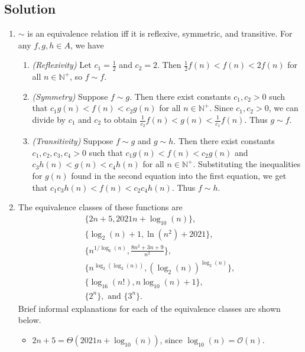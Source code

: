 \documentclass{article}
\begin{document}
\subsection*{Solution}
    \begin{enumerate}
        \item $\sim$ is an equivalence relation iff it is reflexive, symmetric, and transitive. For any $f, g, h \in A$, we have
        \begin{enumerate}[label = \arabic*.]
            \item \textit{(Reflexivity)} Let $c_{1} = \frac{1}{2}$ and $c_{2} = 2$. Then $\frac{1}{2}f(n) < f(n) < 2f(n)$ for all $n \in \mathbb{N^{+}}$, so $f \sim f$.
            \item \textit{(Symmetry)} Suppose $f \sim g$. Then there exist constants $c_{1}, c_{2} > 0$ such that $c_{1}g(n) < f(n) < c_{2}g(n)$ for all $n \in \mathbb{N^{+}}$. Since $c_{1}, c_{2} > 0$, we can divide by $c_{1}$ and $c_{2}$ to obtain $\frac{1}{c_{2}}f(n) < g(n) < \frac{1}{c_{1}}f(n)$. Thus $g \sim f$.
            \item \textit{(Transitivity)} Suppose $f \sim g$ and $g \sim h$. Then there exist constants $c_{1}, c_{2}, c_{3}, c_{4} > 0$ such that $c_{1}g(n) < f(n) < c_{2}g(n)$ and $c_{3}h(n) < g(n) < c_{4}h(n)$ for all $n \in \mathbb{N^{+}}$. Substituting the inequalities for $g(n)$ found in the second equation into the first equation, we get that $c_{1}c_{3}h(n) < f(n) < c_{2}c_{4}h(n)$. Thus $f \sim h$.
        \end{enumerate}
        \item The equivalence classes of these functions are
        \begin{gather*}
            \{2n + 5, 2021n + \log_{10}(n)\}, \\
            \{\log_{2}(n) + 1, \ln(n^{2}) + 2021\}, \\
            \{n^{1/\log_{6}(n)}, \textstyle \frac{8n^{2} + 3n + 9}{n^{2}}\}, \\
            \{n^{\log_{2}(\log_{2}(n))}, (\log_{2}(n))^{\log_{2}(n)}\}, \\
            \{\log_{16}(n!), n\log_{10}(n) + 1\}, \\
            \{2^{n}\}, \text{ and } \{3^{n}\}.
        \end{gather*} 
        Brief informal explanations for each of the equivalence classes are shown below.
        \begin{itemize}
            \item $2n + 5 = \Theta(2021n + \log_{10}(n))$, since $\log_{10}(n) = \mathcal{O}(n)$.

\end{itemize}
\end{enumerate}
\end{document}
